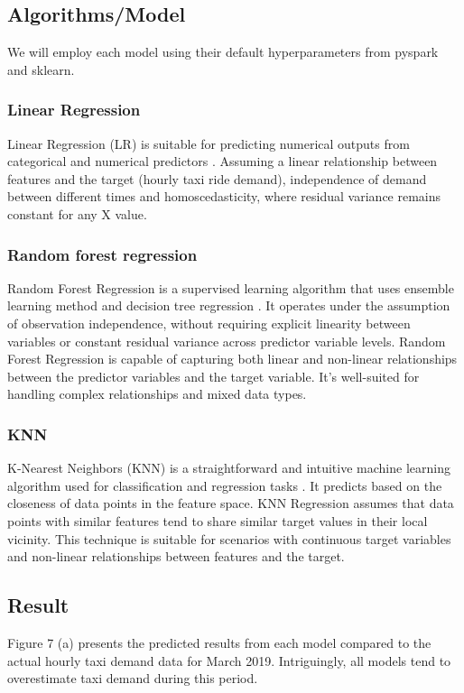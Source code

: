 \documentclass[11pt]{article}
\begin{document}
\subsection{Algorithms/Model}
We will employ each model using their default hyperparameters from pyspark and sklearn.
\subsubsection{Linear Regression}
Linear Regression (LR) is suitable for predicting numerical outputs from categorical and numerical predictors \cite{Linear_regression}. Assuming a linear relationship between features and the target (hourly taxi ride demand), independence of demand between different times and homoscedasticity, where residual variance remains constant for any X value.

\subsubsection{Random forest regression}
Random Forest Regression is a supervised learning algorithm that uses ensemble learning method and decision tree regression \cite{random_forest}. It operates under the assumption of observation independence, without requiring explicit linearity between variables or constant residual variance across predictor variable levels. Random Forest Regression is capable of capturing both linear and non-linear relationships between the predictor variables and the target variable. It's well-suited for handling complex relationships and mixed data types.

\subsubsection{KNN}
K-Nearest Neighbors (KNN) is a straightforward and intuitive machine learning algorithm used for classification and regression tasks \cite{KNN}. It predicts based on the closeness of data points in the feature space. KNN Regression assumes that data points with similar features tend to share similar target values in their local vicinity. This technique is suitable for scenarios with continuous target variables and non-linear relationships between features and the target.

\subsection{Result}
Figure 7 (a) presents the predicted results from each model compared to the actual hourly taxi demand data for March 2019. Intriguingly, all models tend to overestimate taxi demand during this period. 
\end{document}
